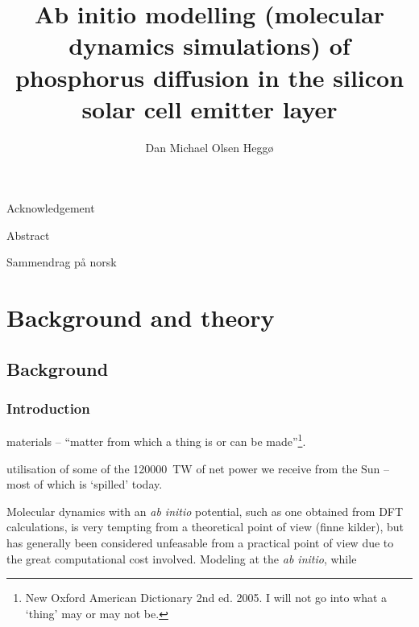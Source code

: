 \documentclass[11pt,bibliography=totoc,index=totoc]{scrbook}   %
\title{Ab initio modelling (molecular dynamics simulations) of phosphorus diffusion in the silicon solar cell emitter layer}
\author{Dan Michael Olsen Heggø}
\begin{document}
\frontmatter
\maketitle

Acknowledgement

Abstract

Sammendrag på norsk



\tableofcontents

\mainmatter

\part{Background and theory}

\chapter{Background} %

\section{Introduction}


materials -- ``matter from which a thing is or can be made''\footnote{New Oxford American Dictionary 2nd ed. 2005. I will not 
go into what a `thing' may or may not be.}. 


utilisation of some of the \SI{120000}{\tera\watt}
of net power we receive from the Sun -- most of which is `spilled' today. 

Molecular dynamics with an \textit{ab initio} potential, such as one obtained from DFT calculations, is very tempting from a theoretical point of view (finne kilder), but has generally been considered unfeasable from a practical point of view due to the great computational cost involved.
Modeling at the \textit{ab initio}, while 
\end{document}
